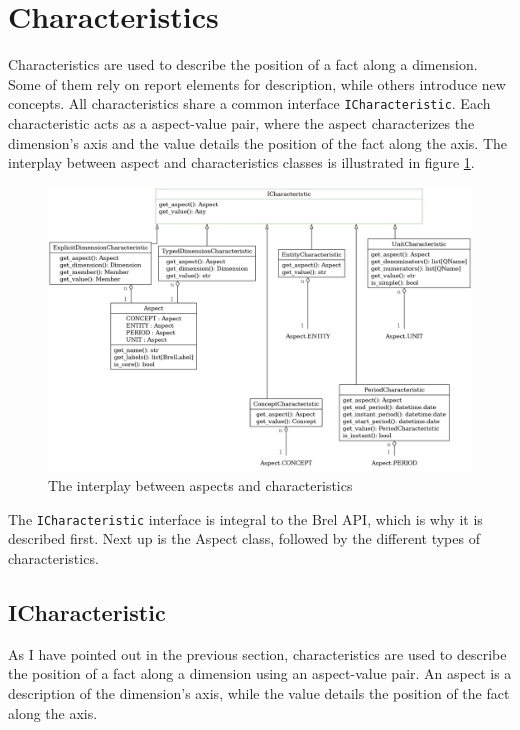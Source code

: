 \section{Characteristics}
\label{sec:characteristics}

Characteristics are used to describe the position of a fact along a dimension.
Some of them rely on report elements for description, while others introduce new concepts. 
All characteristics share a common interface \texttt{ICharacteristic}.
Each characteristic acts as a aspect-value pair, 
where the aspect characterizes the dimension's axis and the value details the position of the fact along the axis.
The interplay between aspect and characteristics classes is illustrated in figure \ref{fig:characteristics}.

\begin{figure}[H]
    \centering
    \includegraphics[width=\textwidth]{images/brel_characteristics_classes.png}
    \caption{The interplay between aspects and characteristics}
    \label{fig:characteristics}
\end{figure}

The \texttt{ICharacteristic} interface is integral to the Brel API, which is why it is described first.
Next up is the Aspect class, followed by the different types of characteristics.

\subsection{ICharacteristic}

As I have pointed out in the previous section, characteristics are used to describe the position of a fact along a dimension using an aspect-value pair.
An aspect is a description of the dimension's axis, while the value details the position of the fact along the axis.

